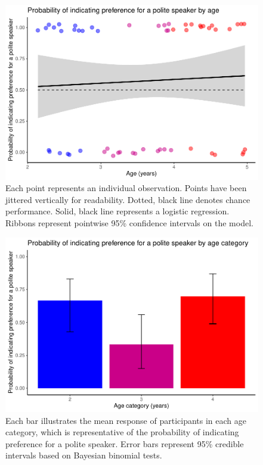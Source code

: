 \documentclass[
  english,
  man,floatsintext]{apa6}
\begin{document}
\begin{figure}
\centering
\includegraphics{writeup_files/figure-latex/unnamed-chunk-1-1.pdf}
\caption{\label{fig:unnamed-chunk-1}Each point represents an individual observation. Points have been jittered vertically for readability. Dotted, black line denotes chance performance. Solid, black line represents a logistic regression. Ribbons represent pointwise 95\% confidence intervals on the model.}
\end{figure}

\begin{figure}
\centering
\includegraphics{writeup_files/figure-latex/unnamed-chunk-2-1.pdf}
\caption{\label{fig:unnamed-chunk-2}Each bar illustrates the mean response of participants in each age category, which is representative of the probability of indicating preference for a polite speaker. Error bars represent 95\% credible intervals based on Bayesian binomial tests.}
\end{figure}
\end{document}
